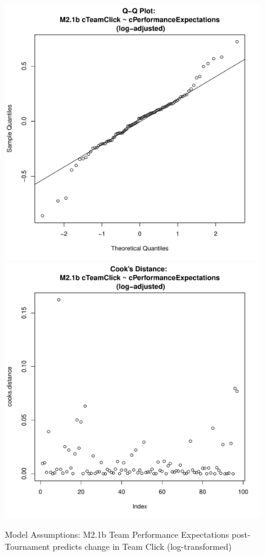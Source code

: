 \documentclass[12pt]{report}
\begin{document}
{\begin{figure}[htbp]
  \includegraphics[scale =.4]{../images/MLM21bLogQQNorm.pdf}
  \includegraphics[scale =.4]{../images/MLM21bLogCooksD.pdf}
  \caption{Model Assumptions: M2.1b Team Performance Expectations post-Tournament predicts change in Team Click (log-transformed)}
  \label{fig:MLM21bLogAssumptions}
\end{figure}


}
\end{document}
